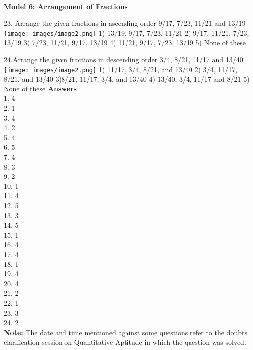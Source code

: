 \documentclass[
]{article}
\begin{document}
\textbf{ \\ Model 6: Arrangement of Fractions \\}

23. Arrange the given fractions in ascending order  9/17, 7/23, 11/21 and 13/19 \\
\texttt{[image: images/image2.png]} 1) 13/19, 9/17, 7/23, 11/21	2) 9/17, 11/21, 7/23, 13/19	3) 7/23, 11/21, 9/17, 13/19	4) 11/21, 9/17, 7/23, 13/19	5) None of these

24.Arrange the given fractions in descending order  3/4, 8/21, 11/17 and 13/40 \\
\texttt{[image: images/image2.png]} 1) 11/17, 3/4, 8/21, and 13/40 2) 3/4, 11/17, 8/21, and 13/40 3)8/21, 11/17, 3/4, and 13/40 4) 13/40, 3/4, 11/17 and 8/21 5) None of these
\newpage
{\large \textbf{Answers \\}}
1.  4 \\
2.  1 \\
3.  4 \\
4.  2 \\
5.  4 \\
6.  5 \\
7.  4 \\
8.  3 \\
9.  2 \\
10. 1 \\
11. 4 \\
12. 5 \\
13. 3 \\
14. 5 \\
15. 1 \\
16. 4 \\
17. 4 \\
18. 1 \\
19. 4 \\
20. 4 \\
21. 2 \\
22. 1 \\
23. 3 \\
24. 2 \\

\textbf{Note:} The date and time mentioned against some questions refer to the doubts clarification
session on Quantitative Aptitude in which the question was solved.
\end{document}
